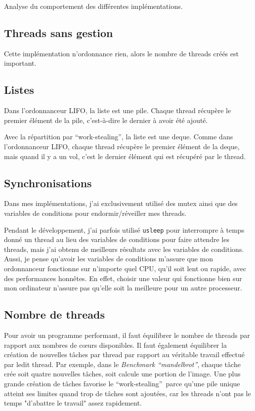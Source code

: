 \documentclass[a4paper]{article}
\def\coeur{c\oe{}ur}
\def\mandel{\enquote{mandelbrot}}
\def\btwo{\textit{Benchmark \mandel}}
\def\ws{\enquote{work-stealing}}
\begin{document}
Analyse du comportement des différentes implémentations.

\subsection{Threads sans gestion}
Cette implémentation n'ordonnance rien, alors le nombre de threads
créés est important.

\subsection{Listes}
Dans l'ordonnanceur LIFO, la liste est une pile. Chaque thread récupère le
premier élément de la pile, c'est-à-dire le dernier à avoir été ajouté.

Avec la répartition par \ws, la liste est une deque. Comme dans l'ordonnanceur
LIFO, chaque thread récupère le premier élément de la deque, mais quand il y a
un vol, c'est le dernier élément qui est récupéré par le thread.

\subsection{Synchronisations}
Dans mes implémentations, j'ai exclusivement utilisé des mutex ainsi que des
variables de conditions pour endormir/réveiller mes threads.

Pendant le développement, j'ai parfois utilisé \texttt{usleep} pour interrompre
à temps donné un thread au lieu des variables de conditions pour faire
attendre les threads, mais j'ai obtenu de meilleurs résultats avec les variables
de conditions. Aussi, je pense qu'avoir les variables de conditions m'assure
que mon ordonnanceur fonctionne sur n'importe quel CPU, qu'il soit lent ou rapide,
avec des performances honnêtes. En effet, choisir une valeur qui fonctionne bien
sur mon ordinateur n'assure pas qu'elle soit la meilleure pour un autre processeur.

\subsection{Nombre de threads}
Pour avoir un programme performant, il faut équilibrer le nombre de threads par
rapport aux nombres de \coeur{}s disponibles. Il faut également équilibrer la
création de nouvelles tâches par thread par rapport au véritable travail
effectué par ledit thread. Par exemple, dans le \btwo, chaque tâche crée soit
quatre nouvelles tâches, soit calcule une portion de l'image. Une plus grande
création de tâches favorise le \ws~parce qu'une pile unique atteint ses limites
quand trop de tâches sont ajoutées, car les threads n'ont pas le temps
"d'abattre le travail" assez rapidement.
\end{document}
